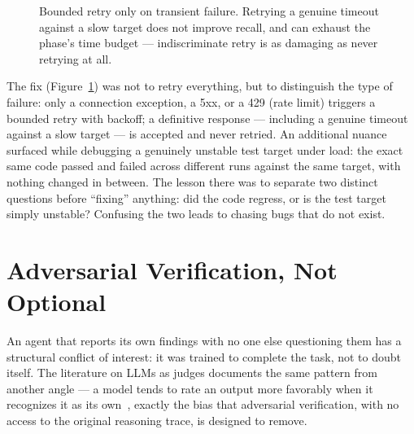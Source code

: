 \documentclass[10pt]{article}
\begin{document}
\begin{figure}[h]
\centering
{}
\caption{Bounded retry only on transient failure. Retrying a genuine timeout against a slow target does not improve recall, and can exhaust the phase's time budget --- indiscriminate retry is as damaging as never retrying at all.}
\label{fig:retry}
\end{figure}

The fix (Figure~\ref{fig:retry}) was not to retry everything, but to distinguish the type of failure: only a connection exception, a 5xx, or a 429 (rate limit) triggers a bounded retry with backoff; a definitive response --- including a genuine timeout against a slow target --- is accepted and never retried. An additional nuance surfaced while debugging a genuinely unstable test target under load: the exact same code passed and failed across different runs against the same target, with nothing changed in between. The lesson there was to separate two distinct questions before ``fixing'' anything: did the code regress, or is the test target simply unstable? Confusing the two leads to chasing bugs that do not exist.

\section{Adversarial Verification, Not Optional}

An agent that reports its own findings with no one else questioning them has a structural conflict of interest: it was trained to complete the task, not to doubt itself. The literature on LLMs as judges documents the same pattern from another angle --- a model tends to rate an output more favorably when it recognizes it as its own~\cite{selfpreference2026}, exactly the bias that adversarial verification, with no access to the original reasoning trace, is designed to remove.
\end{document}
